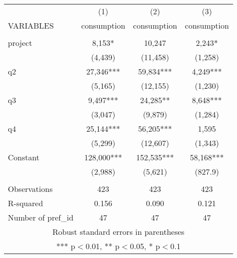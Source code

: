 \documentclass[]{article}
\begin{document}
\begin{tabular}{lccc} \hline
 & (1) & (2) & (3) \\
VARIABLES & consumption & consumption & consumption \\ \hline
 &  &  &  \\
project & 8,153* & 10,247 & 2,243* \\
 & (4,439) & (11,458) & (1,258) \\
q2 & 27,346*** & 59,834*** & 4,249*** \\
 & (5,165) & (12,155) & (1,230) \\
q3 & 9,497*** & 24,285** & 8,648*** \\
 & (3,047) & (9,879) & (1,284) \\
q4 & 25,144*** & 56,205*** & 1,595 \\
 & (5,299) & (12,607) & (1,343) \\
Constant & 128,000*** & 152,535*** & 58,168*** \\
 & (2,988) & (5,621) & (827.9) \\
 &  &  &  \\
Observations & 423 & 423 & 423 \\
R-squared & 0.156 & 0.090 & 0.121 \\
 Number of pref\_id & 47 & 47 & 47 \\ \hline
\multicolumn{4}{c}{ Robust standard errors in parentheses} \\
\multicolumn{4}{c}{ *** p$<$0.01, ** p$<$0.05, * p$<$0.1} \\
\end{tabular}
\end{document}
